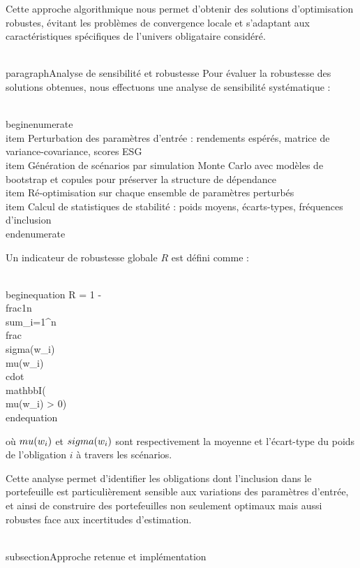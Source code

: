 Cette approche algorithmique nous permet d'obtenir des solutions d'optimisation robustes, évitant les problèmes de convergence locale et s'adaptant aux caractéristiques spécifiques de l'univers obligataire considéré.

\\paragraph{Analyse de sensibilité et robustesse}
Pour évaluer la robustesse des solutions obtenues, nous effectuons une analyse de sensibilité systématique :

\\begin{enumerate}
    \\item Perturbation des paramètres d'entrée : rendements espérés, matrice de variance-covariance, scores ESG
    \\item Génération de scénarios par simulation Monte Carlo avec modèles de bootstrap et copules pour préserver la structure de dépendance
    \\item Ré-optimisation sur chaque ensemble de paramètres perturbés
    \\item Calcul de statistiques de stabilité : poids moyens, écarts-types, fréquences d'inclusion
\\end{enumerate}

Un indicateur de robustesse globale $R$ est défini comme :

\\begin{equation}
R = 1 - \\frac{1}{n} \\sum_{i=1}^{n} \\frac{\\sigma(w_i)}{\\mu(w_i)} \\cdot \\mathbb{I}(\\mu(w_i) > 0)
\\end{equation}

où $\\mu(w_i)$ et $\\sigma(w_i)$ sont respectivement la moyenne et l'écart-type du poids de l'obligation $i$ à travers les scénarios.

Cette analyse permet d'identifier les obligations dont l'inclusion dans le portefeuille est particulièrement sensible aux variations des paramètres d'entrée, et ainsi de construire des portefeuilles non seulement optimaux mais aussi robustes face aux incertitudes d'estimation.

\\subsection{Approche retenue et implémentation}

